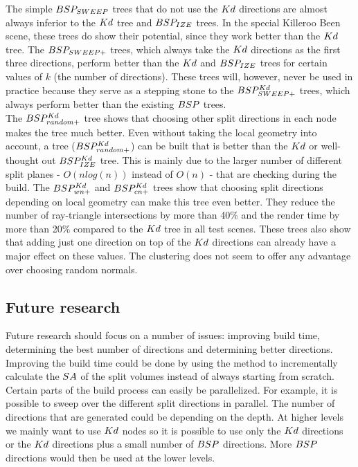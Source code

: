 The simple $BSP_{SWEEP}$ trees that do not use the $Kd$ directions are almost  always inferior to the $Kd$ tree and $BSP_{IZE}$ trees.
In the special Killeroo Been scene, these trees do show their potential, since they work better than the $Kd$ tree.
The $BSP_{SWEEP+}$ trees, which always take the $Kd$ directions as the first three directions, perform better than the $Kd$ and $BSP_{IZE}$ trees for certain values of $k$ (the number of directions).
These trees will, however, never be used in practice because they serve as a stepping stone to the $BSP^{Kd}_{SWEEP+}$ trees, which always perform better than the existing $BSP$ trees. \\

The $BSP^{Kd}_{random+}$ tree shows that choosing other split directions in each node makes the tree much better.
Even without taking the local geometry into account, a tree ($BSP^{Kd}_{random+}$) can be built that is better than the $Kd$ or well-thought out $BSP^{Kd}_{IZE}$ tree.
This is mainly due to the larger number of different split planes - $O(nlog (n))$ instead of $O (n)$ - that are checking during the build.
The $BSP^{Kd}_{wn+}$ and $BSP^{Kd}_{cn+}$ trees show that choosing split directions depending on local geometry can make this tree even better.
They reduce the number of ray-triangle intersections by more than 40\% and the render time by more than 20\% compared to the $Kd$ tree in all test scenes.
These trees also show that adding just one direction on top of the $Kd$ directions can already have a major effect on these values.
The clustering does not seem to offer any advantage over choosing random normals.

\newpage
\subsection{Future research}
Future research should focus on a number of issues: improving build time, determining the best number of directions and determining better directions.
Improving the build time could be done by using the \authorBudge{} \cite{Budge} method to incrementally calculate the $SA$ of the split volumes instead of always starting from scratch.
Certain parts of the build process can easily be parallelized.
For example, it is possible to sweep over the different split directions in parallel.
The number of directions that are generated could be depending on the depth.
At higher levels we mainly want to use $Kd$ nodes so it is possible to use only the $Kd$ directions or the $Kd$ directions plus a small number of $BSP$ directions. More $BSP$ directions would then be used at the lower levels. \\

